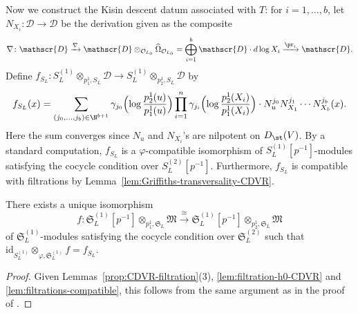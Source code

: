 Now we construct the Kisin descent datum associated with $T$: for $i = 1, \ldots, b$, let $N_{X_i}\colon \mathscr{D} \rightarrow \mathscr{D}$ be the derivation given as the composite 
\[
\nabla\colon \mathscr{D} \xrightarrow{\nabla} \mathscr{D}\otimes_{\mathcal{O}_{L_0}} \widehat{\Omega}_{\mathcal{O}_{L_0}} = \bigoplus\limits_{i=1}^b \mathscr{D} \cdot d\operatorname{log} X_i\xrightarrow{\pr_i}\mathscr{D}.
\]
 Define $f_{S_L}\colon S_L^{(1)}\otimes_{p^1_1, S_L} \mathscr{D} \rightarrow S_L^{(1)}\otimes_{p^1_2, S_L} \mathscr{D}$ by
\begin{equation} \label{eq:descent isom on S_L^1}
f_{S_L}(x) = \sum_{(j_0, \ldots, j_b)\in\N^{b+1}} \gamma_{j_0}\Bigl( \operatorname{log}\frac{p^1_2(u)}{p^1_1(u)}\Bigr) \prod_{i=1}^n \gamma_{j_i}\Bigl( \operatorname{log}\frac{p^1_2(X_i)}{p^1_1(X_i)}\Bigr) \cdot N_u^{j_0}N_{X_1}^{j_1}\cdots N_{X_b}^{j_b}(x).  
\end{equation} 
Here the sum converges since $N_u$ and $N_{X_i}$'s are nilpotent on $D_{\st}(V)$. By a standard computation, $f_{S_L}$ is a $\varphi$-compatible isomorphism of $S_L^{(1)}[p^{-1}]$-modules satisfying the cocycle condition over $S_L^{(2)}[p^{-1}]$. Furthermore, $f_{S_L}$ is compatible with filtrations by Lemma~\ref{lem:Griffiths-transversality-CDVR}.  

\begin{prop}\label{prop:rational Kisin descent datum in CDVR case}
There exists a unique isomorphism
\[
f\colon \mathfrak{S}_L^{(1)}[p^{-1}]\otimes_{p^1_1, \mathfrak{S}_L} \mathfrak{M} \stackrel{\cong}{\rightarrow} \mathfrak{S}_L^{(1)}[p^{-1}]\otimes_{p^1_2, \mathfrak{S}_L} \mathfrak{M}
\]
of $\mathfrak{S}_L^{(1)}$-modules satisfying the cocycle condition over $\mathfrak{S}_L^{(2)}$ such that $\mathrm{id}_{S_L^{(1)}}\otimes_{\varphi, \mathfrak{S}_L^{(1)}} f = f_{S_L}$.
\end{prop}

\begin{proof}
Given Lemmas~\ref{prop:CDVR-filtration}(3), \ref{lem:filtration-h0-CDVR} and \ref{lem:filtrations-compatible}, this follows from the same argument as in the proof of \cite[Lem.~4.5, Prop.~4.6, 4.9]{du-liu-moon-shimizu-completed-prismatic-F-crystal-loc-system}.
\end{proof}

